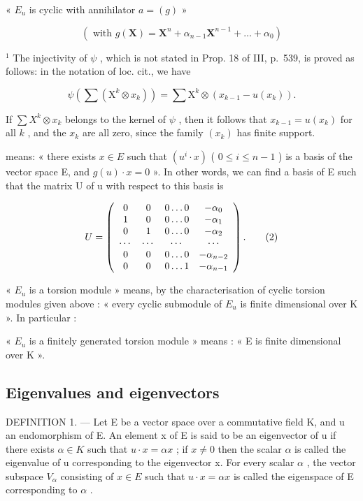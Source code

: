 « \(E_{u}\) is cyclic with annihilator \(a = (g)\) »

\[
\left(\text { with } g (\mathbf {X}) = \mathbf {X} ^ {n} + \alpha_ {n - 1} \mathbf {X} ^ {n - 1} + \dots + \alpha_ {0}\right)
\]

\(^{1}\) The injectivity of \(\psi\) , which is not stated in Prop. 18 of III, p.~539, is proved as follows: in the notation of loc. cit., we have

\[
\psi \left(\sum \left(\mathrm{X} ^ {k} \otimes x _ {k}\right)\right) = \sum \mathrm{X} ^ {k} \otimes \left(x _ {k - 1} - u (x _ {k})\right).
\]

If \(\sum X^k \otimes x_k\) belongs to the kernel of \(\psi\) , then it follows that \(x_{k-1} = u(x_k)\) for all \(k\) , and the \(x_k\) are all zero, since the family \((x_k)\) has finite support.

means: « there exists \(x \in E\) such that \((u^{i} \cdot x)\) ( \(0 \leqslant i \leqslant n - 1\) ) is a basis of the vector space E, and \(g(u) \cdot x = 0\) ». In other words, we can find a basis of E such that the matrix U of u with respect to this basis is

\[
U = \left( \begin{array}{c c c c} 0 & 0 & 0 \dots 0 & - \alpha_ {0} \\ 1 & 0 & 0 \dots 0 & - \alpha_ {1} \\ 0 & 1 & 0 \dots 0 & - \alpha_ {2} \\ \cdots & \cdots & \cdots & \cdots \\ 0 & 0 & 0 \dots 0 & - \alpha_ {n - 2} \\ 0 & 0 & 0 \dots 1 & - \alpha_ {n - 1} \end{array} \right).\tag{2}
\]

« \(E_{u}\) is a torsion module » means, by the characterisation of cyclic torsion modules given above : « every cyclic submodule of \(E_{u}\) is finite dimensional over K ». In particular :

« \(E_{u}\) is a finitely generated torsion module » means : « E is finite dimensional over K ».

\subsection{Eigenvalues and eigenvectors}

DEFINITION 1. --- Let E be a vector space over a commutative field K, and u an endomorphism of E. An element x of E is said to be an eigenvector of u if there exists \(\alpha \in K\) such that \(u \cdot x = \alpha x\) ; if \(x \neq 0\) then the scalar \(\alpha\) is called the eigenvalue of u corresponding to the eigenvector x. For every scalar \(\alpha\) , the vector subspace \(V_{\alpha}\) consisting of \(x \in E\) such that \(u \cdot x = \alpha x\) is called the eigenspace of E corresponding to \(\alpha\) .

